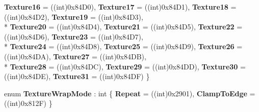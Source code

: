 \begin{DoxyCompactItemize}
{\bfseries Texture16} = ((int)0x84\-D0), 
{\bfseries Texture17} = ((int)0x84\-D1), 
{\bfseries Texture18} = ((int)0x84\-D2), 
{\bfseries Texture19} = ((int)0x84\-D3), 
\\*
{\bfseries Texture20} = ((int)0x84\-D4), 
{\bfseries Texture21} = ((int)0x84\-D5), 
{\bfseries Texture22} = ((int)0x84\-D6), 
{\bfseries Texture23} = ((int)0x84\-D7), 
\\*
{\bfseries Texture24} = ((int)0x84\-D8), 
{\bfseries Texture25} = ((int)0x84\-D9), 
{\bfseries Texture26} = ((int)0x84\-D\-A), 
{\bfseries Texture27} = ((int)0x84\-D\-B), 
\\*
{\bfseries Texture28} = ((int)0x84\-D\-C), 
{\bfseries Texture29} = ((int)0x84\-D\-D), 
{\bfseries Texture30} = ((int)0x84\-D\-E), 
{\bfseries Texture31} = ((int)0x84\-D\-F)
 \}
\item 
enum {\bfseries Texture\-Wrap\-Mode} \-: int \{ {\bfseries Repeat} = ((int)0x2901), 
{\bfseries Clamp\-To\-Edge} = ((int)0x812\-F)
 \}
\end{DoxyCompactItemize}
